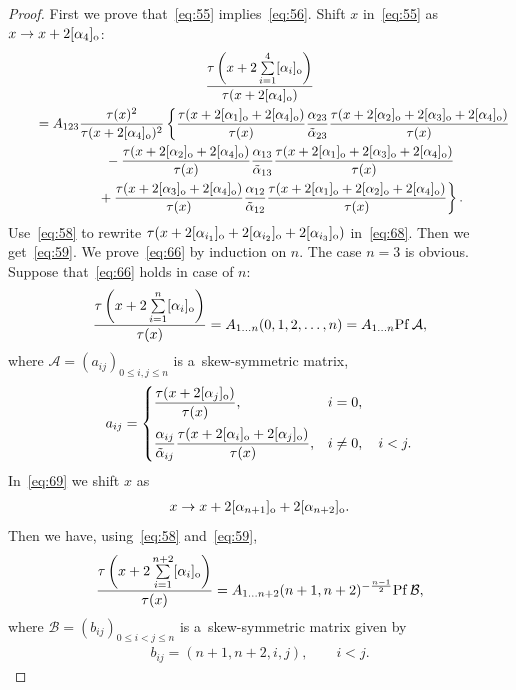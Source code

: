 \documentclass[pdftex]{sigma}
\begin{document}
\begin{proof}
First we prove that~\eqref{eq:55} implies~\eqref{eq:56}.
Shift $x$ in~\eqref{eq:55} as $x\rightarrow x+2[\alpha_4]_{\rm o}$:
\begin{gather}
\frac{\tau\left(x+2\sum\limits_{i=1}^{4}[\alpha_i]_{\rm o}\right)}{\tau(x+2[\alpha_4]_{\rm o})}\nonumber\\
\qquad{}
=A_{123}\frac{\tau(x)^2}{\tau(x+2[\alpha_4]_{\rm o})^2}\left\{\frac{\tau(x+2[\alpha_1]_{\rm o}+2[\alpha_4]_{\rm o})}{\tau(x)}
\frac{\alpha_{23}}{\tilde{\alpha}_{23}}\frac{\tau(x+2[\alpha_2]_{\rm o}+2[\alpha_3]_{\rm o}+2[\alpha_4]_{\rm o})}{\tau(x)}
\right.
\nonumber
\\
\qquad\quad{} -\frac{\tau(x+2[\alpha_2]_{\rm o}+2[\alpha_4]_{\rm o})}{\tau(x)}\frac{\alpha_{13}}{\tilde{\alpha}_{13}}
\frac{\tau(x+2[\alpha_1]_{\rm o}+2[\alpha_3]_{\rm o}+2[\alpha_4]_{\rm o})}{\tau(x)}\nonumber
\\
 \left.
 \qquad\quad{} +\frac{\tau(x+2[\alpha_3]_{\rm o}+2[\alpha_4]_{\rm o})}{\tau(x)}\frac{\alpha_{12}}{\tilde{\alpha}_{12}}
\frac{\tau(x+2[\alpha_1]_{\rm o}+2[\alpha_2]_{\rm o}+2[\alpha_4]_{\rm o})}{\tau(x)}\right\}.
\label{eq:68}
\end{gather}
Use~\eqref{eq:58} to rewrite $\tau(x+2[\alpha_{i_1}]_{\rm o}+2[\alpha_{i_2}]_{\rm o}+2[\alpha_{i_3}]_{\rm o})$
in~\eqref{eq:68}.
Then we get~\eqref{eq:59}.
We prove~\eqref{eq:66} by induction on $n$.
The case $n=3$ is obvious.
Suppose that~\eqref{eq:66} holds in case of $n$:
\begin{gather}
\frac{\tau\left(x+2\sum\limits_{i=1}^{n}[\alpha_i]_{\rm o}\right)}{\tau(x)}=A_{1\dots n}(0,1,2,\dots,n)=A_{1\dots n}{\rm Pf}\, {\mathcal A},
\label{eq:69}
\end{gather}
where ${\mathcal A}=(a_{ij})_{0\le i,j\le n}$ is a~skew-symmetric matrix,
\begin{gather*}%
a_{ij}=
\begin{cases}\dfrac{\tau(x+2[\alpha_j]_{\rm o})}{\tau(x)}, &  i=0,
\vspace{2mm}\\
\dfrac{\alpha_{ij}}{{\tilde{\alpha}}_{ij}}\dfrac{\tau(x+2[\alpha_i]_{\rm o}+2[\alpha_j]_{\rm o})}{\tau(x)}
,&  i\neq0,\quad  i<j.
\end{cases}
\end{gather*}
In~\eqref{eq:69} we shift $x$ as
\begin{gather*}
x\rightarrow x+2[\alpha_{n+1}]_{\rm o}+2[\alpha_{n+2}]_{\rm o}.
\end{gather*}
Then we have, using~\eqref{eq:58} and~\eqref{eq:59},
\begin{gather}
\frac{\tau\left(x+2\sum\limits_{i=1}^{n+2}[\alpha_i]_{\rm o}\right)}{\tau(x)}=A_{1\dots n+2}(n+1,n+2)^{-\frac{n-1}{2}}{\rm Pf}\,
{\mathcal B},
\label{eq:71}
\end{gather}
where ${\mathcal B}=(b_{ij})_{0\le i<j\le n}$ is a~skew-symmetric matrix given by
\begin{gather*}%
b_{ij}=(n+1,n+2,i,j),\qquad  i<j .
\end{gather*}


\end{proof}
\end{document}
